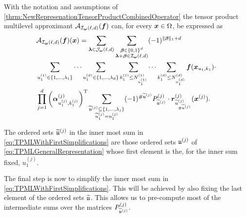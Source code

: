 \documentclass[	a4paper, 
								11pt]{article}
\theoremstyle{plain}
\begin{document}
\begin{corollary}\label{cor:IntermediateNewTPML}
With the notation and assumptions of 
\cref{thrm:NewRepresenationTensorProductCombinedOperator} the tensor product
multilevel approximant $ \mathcal{A}_{\mathcal{I}_{\boldsymbol{\omega}}(\ell,d)}(\boldsymbol{f}) $ can, for every 
$ \boldsymbol{x} \in \Omega $, be expressed as
\begin{align}\label{eq:TPMLWithFirstSimplifications}
\begin{aligned}
 &\mathcal{A}_{\mathcal{I}_{\boldsymbol{\omega}}(\ell,d)}(\boldsymbol{f})(\boldsymbol{x}) = \sum_{\boldsymbol{\lambda} \in \mathcal{J}_{\boldsymbol{\omega}}
 (\ell,d)} \sum_{\substack{\boldsymbol{\beta} \in \{0,1\}^d \\ \boldsymbol{\lambda} + \boldsymbol{\beta} \in \mathcal{I}_
 {\boldsymbol{\omega}}(\ell,d)}}(-1)^{\|\boldsymbol{\beta}\|_1 + d} \\
 & \sum_{u^{(1)}_1 \in \{1, \dots, \lambda_1 \}} \cdots \sum_{u^{(d)}_1 \in
 \{1, \dots, \lambda_d \}} \sum_{k_1^{(1)} \leq N^{(1)}_{u_1^{(1)}}} \cdots
 \sum_{k_1^{(d)} \leq N^{(d)}_{u_1^{(d)}}} \boldsymbol{f}(\boldsymbol{x}_{u_1, k_1}) \cdot \\
 &\prod_{j=1}^{d} \left(\boldsymbol{\alpha}^{(j)}_{u_1^{(j)},k_1^{(j)}}\right)^{\text{T}}
 \sum_{\substack{ \widetilde{\mathfrak{u}}^{(j)} \subseteq \{1,\dots,\lambda_j\} \\ 
 \widetilde{u}^{(j)}_1 = u_1^{(j)}}} (-1)^{\# \widetilde{
 \mathfrak{u}}^{(j)}}  P^{(j)}_{\widetilde{\mathfrak{u}}^{(j)}} \cdot 
  \boldsymbol{r}^{(j)}_{\widetilde{u}^{(j)}_{\# \widetilde{\mathfrak{u}}^{(j)}}} ( \boldsymbol{x}^{(j)}).
\end{aligned}
\end{align}
\end{corollary}

\begin{remark}
 The ordered sets $ \widetilde{\mathfrak{u}}^{(j)} $ in the inner most sum in 
 \eqref{eq:TPMLWithFirstSimplifications} are those ordered sets 
 $ \mathfrak{u}^{(j)} $ of \eqref{eq:TPMLGeneralRepresentation} whose first element
 is the, for the inner sum fixed, $ u_1^{(j)} $.
\end{remark}

The final step is now to simplify the inner most sum in
\eqref{eq:TPMLWithFirstSimplifications}. This will be achieved by also fixing
the last element of the ordered sets $ \widetilde{\mathfrak{u}} $. This allows us to pre-compute most of the intermediate sums over the matrices $ P^{(j)}_
 {\widetilde{\mathfrak{u}}^{(j)}} $.
\end{document}
